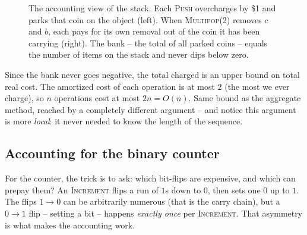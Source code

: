 \begin{figure}[h]
\centering
{}
\caption{The accounting view of the stack. Each \textsc{Push} overcharges by \$1
and parks that coin on the object (left). When \textsc{Multipop}(2) removes
$c$ and $b$, each pays for its own removal out of the coin it has been carrying
(right). The bank -- the total of all parked coins -- equals the number of items
on the stack and never dips below zero.}
\label{ch17:stack-credit}
\end{figure}

Since the bank never goes negative, the total charged is an upper bound on total
real cost. The amortized cost of each operation is at most $2$ (the most we ever
charge), so $n$ operations cost at most $2n = O(n)$. Same bound as the aggregate
method, reached by a completely different argument -- and notice this argument is
more \emph{local}: it never needed to know the length of the sequence.

\subsection{Accounting for the binary counter}

For the counter, the trick is to ask: which bit-flips are expensive, and which can
prepay them? An \textsc{Increment} flips a run of $1$s down to $0$, then sets one
$0$ up to $1$. The flips $1 \to 0$ can be arbitrarily numerous (that is the carry
chain), but a $0 \to 1$ flip -- setting a bit -- happens \emph{exactly once} per
\textsc{Increment}. That asymmetry is what makes the accounting work.

